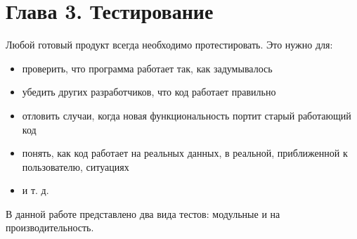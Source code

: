 \documentclass[12pt]{article}
\begin{document}
{		\newpage
		
		\section{Глава 3. Тестирование}
				\par Любой готовый продукт всегда необходимо протестировать. Это нужно для:
				\begin{itemize}
					\item проверить, что программа работает так, как задумывалось
					\item убедить других разработчиков, что код работает правильно
					\item отловить случаи, когда новая функциональность портит старый работающий код
					\item понять, как код работает на реальных данных, в реальной, приближенной к пользователю, ситуациях
					\item и т. д.
				\end{itemize}
				\par В данной работе представлено два вида тестов: модульные и на производительность.
}
\end{document}
